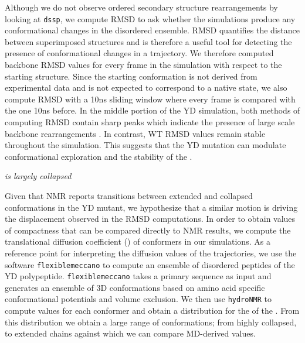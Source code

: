 Although we do not observe ordered secondary structure rearrangements by looking at \texttt{dssp}, we compute RMSD to ask whether the simulations produce any conformational changes in the disordered ensemble. RMSD quantifies the distance between superimposed structures and is therefore a useful tool for detecting the presence of conformational changes in a trajectory. We therefore computed backbone RMSD values for every frame in the simulation with respect to the starting structure. Since the starting conformation is not derived from experimental data and is not expected to correspond to a native state, we also compute RMSD with a 10ns sliding window where every frame is compared with the one 10ns before. In the middle portion of the YD simulation, both methods of computing RMSD contain sharp peaks which indicate the presence of large scale backbone rearrangements . In contrast, WT RMSD values remain stable throughout the simulation. This suggests that the YD mutation can modulate conformational exploration and the stability of the \gct. 


\begin{figure}
	\centering     %
	\label{fig:rmsd}
\end{figure}
	
{\it \gct is largely collapsed}

Given that NMR reports transitions between extended and collapsed conformations in the YD mutant, we hypothesize that a similar motion is driving the displacement observed in the RMSD computations. In order to obtain values of compactness that can be compared directly to NMR results, we compute the translational diffusion coefficient (\diffusion) of conformers in our simulations. As a reference point for interpreting the diffusion values of the trajectories, we use the software \texttt{flexiblemeccano} to compute an ensemble of disordered peptides of the YD polypeptide. \texttt{flexiblemeccano} takes a primary sequence as input and generates an ensemble of 3D conformations based on amino acid specific conformational potentials and volume exclusion. We then use \texttt{hydroNMR} to compute \diffusion values for each conformer and obtain a distribution for the \diffusion of the \gct. From this distribution  we obtain a large range of conformations; from highly collapsed, to extended chains against which we can compare MD-derived values.

